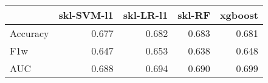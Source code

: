 \begin{tabular}{lrrrr}
\toprule
{} &  skl-SVM-l1 &  skl-LR-l1 &  skl-RF &  xgboost \\
\midrule
Accuracy &       0.677 &      0.682 &   0.683 &    0.681 \\
F1w      &       0.647 &      0.653 &   0.638 &    0.648 \\
AUC      &       0.688 &      0.694 &   0.690 &    0.699 \\
\bottomrule
\end{tabular}
